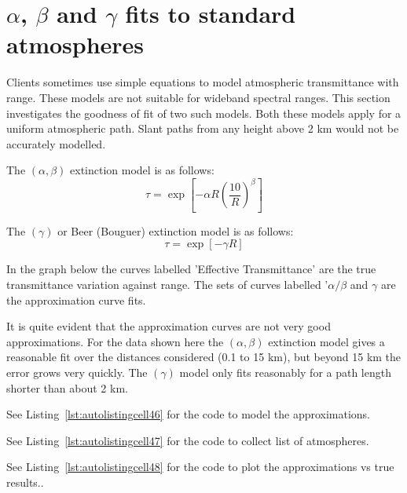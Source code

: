 \documentclass{workpackage}
\begin{document}
\chapter{$\alpha$, $\beta$  and $\gamma$ fits to standard atmospheres}
\label{sec:alphabetaandgammafitstostandardatmospheres}

Clients sometimes use simple equations to model atmospheric transmittance with range.  These models are not suitable for wideband spectral ranges.  This section investigates the goodness of fit of two such models.  Both these models apply for a uniform atmospheric path. Slant paths from any height above 2 km would not be accurately modelled.


The $(\alpha,\beta)$ extinction model  is as follows:\begin{equation}\tau = \exp{\left[-\alpha R \left( \frac{10}{R}\right)^\beta \right]}\end{equation}


The $(\gamma)$  or Beer (Bouguer) extinction model  is as follows:\begin{equation}\tau = \exp{\left[-\gamma R \right]}\end{equation}


In the graph below the curves labelled 'Effective Transmittance' are the true transmittance variation against range.  The sets of curves labelled '$\alpha/\beta$ and $\gamma$ are the approximation curve fits.


It is quite evident that the approximation curves are not very good approximations.  For the data shown here the $(\alpha,\beta)$ extinction model gives a reasonable fit over the distances considered (0.1 to 15 km), but beyond 15 km the error grows very quickly.  The $(\gamma)$ model only fits reasonably for a path length shorter than about 2 km.




See Listing~\ref{lst:autolistingcell46} for the code to model the approximations.



See Listing~\ref{lst:autolistingcell47} for the code to collect list of atmospheres.



See Listing~\ref{lst:autolistingcell48} for the code to plot the approximations vs true results..
\end{document}
